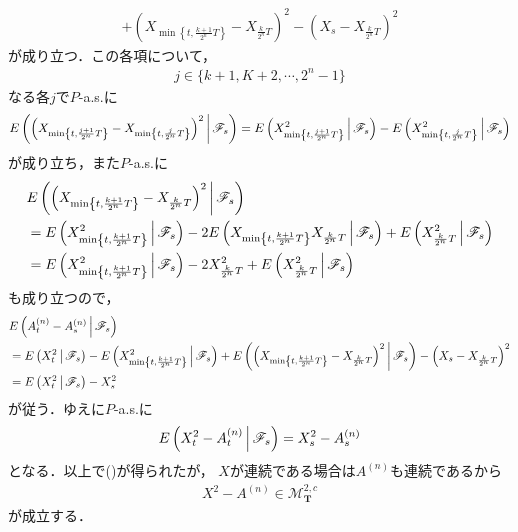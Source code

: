 \begin{sketch}
\begin{description}
\begin{align}
					+ \left(X_{\min\left\{t,\frac{k+1}{2^n}T\right\}} - X_{\frac{k}{2^n}T}\right)^2
					- \left(X_s - X_{\frac{k}{2^n}T}\right)^2
				\end{align}
				が成り立つ．この各項について，
				\begin{align}
					j \in \{k+1,K+2,\cdots,2^n-1\}
				\end{align}
				なる各$j$で$P$-a.s.に
				\begin{align}
					E\left(  \left(X_{\min\left\{t,\frac{j+1}{2^n}T\right\}} - X_{\min\left\{t,\frac{j}{2^n}T\right\}}\right)^2 \, \middle|\, \mathscr{F}_s \right)
					= E\left( X^2_{\min\left\{t,\frac{j+1}{2^n}T\right\}} \, \middle|\, \mathscr{F}_s \right)
					 - E\left( X^2_{\min\left\{t,\frac{j}{2^n}T\right\}} \, \middle|\, \mathscr{F}_s \right)
				\end{align}
				が成り立ち，また$P$-a.s.に
				\begin{align}
					&E\left( \left(X_{\min\left\{t,\frac{k+1}{2^n}T\right\}} - X_{\frac{k}{2^n}T}\right)^2 \, \middle|\, \mathscr{F}_s \right) \\
					&= E\left( X_{\min\left\{t,\frac{k+1}{2^n}T\right\}}^2 \, \middle|\, \mathscr{F}_s \right)
					- 2 E\left( X_{\min\left\{t,\frac{k+1}{2^n}T\right\}}X_{\frac{k}{2^n}T} \, \middle|\, \mathscr{F}_s \right)
					+ E\left( X_{\frac{k}{2^n}T}^2 \, \middle|\, \mathscr{F}_s \right) \\
					&= E\left( X_{\min\left\{t,\frac{k+1}{2^n}T\right\}}^2 \, \middle|\, \mathscr{F}_s \right)
					- 2 X_{\frac{k}{2^n}T}^2
					+ E\left( X_{\frac{k}{2^n}T}^2 \, \middle|\, \mathscr{F}_s \right) \\
				\end{align}
				も成り立つので，
				\begin{align}
					&E\left( A^{(n)}_t - A^{(n)}_s \, \middle|\, \mathscr{F}_s \right) \\
					&= E\left( X^2_t \, \middle|\, \mathscr{F}_s \right)
					- E\left( X^2_{\min\left\{t,\frac{k+1}{2^n}T\right\}} \, \middle|\, \mathscr{F}_s \right)
					+ E\left( \left(X_{\min\left\{t,\frac{k+1}{2^n}T\right\}} - X_{\frac{k}{2^n}T}\right)^2 \, \middle|\, \mathscr{F}_s \right)
					- \left(X_s - X_{\frac{k}{2^n}T}\right)^2 \\
					&= E\left( X^2_t \, \middle|\, \mathscr{F}_s \right) - X_s^2
				\end{align}
				が従う．ゆえに$P$-a.s.に
				\begin{align}
					E\left( X^2_t - A^{(n)}_t \, \middle|\, \mathscr{F}_s \right) = X^2_s - A^{(n)}_s
				\end{align}
				となる．以上で()が得られたが，
				$X$が連続である場合は$A^{(n)}$も連続であるから
				\begin{align}
					X^2 - A^{(n)} \in \mathscr{M}^{2,c}_{\mathbf{T}}
					\label{fom:thm_decomposition_of_square_integrable_martingales_3}
				\end{align}
				が成立する．
				

\end{description}
\end{sketch}
